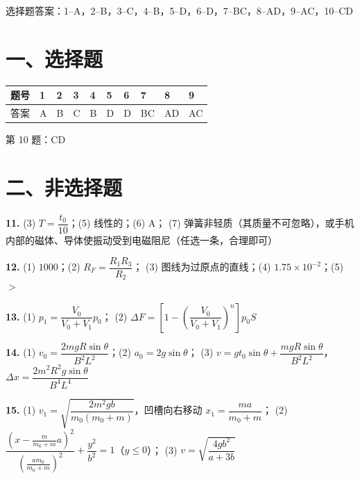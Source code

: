 
\begin{gknotice}
  选择题答案：1--A，2--B，3--C，4--B，5--D，6--D，7--BC，8--AD，9--AC，10--CD
\end{gknotice}

\section*{一、选择题}

\noindent
\begin{tabular}{@{}llllllllll@{}}
\toprule
题号 & 1 & 2 & 3 & 4 & 5 & 6 & 7 & 8 & 9\\
\midrule
答案 & A & B & C & B & D & D & BC & AD & AC\\
\bottomrule
\end{tabular}

\smallskip

\noindent
第 10 题：CD

\section*{二、非选择题}

\noindent
\textbf{11.} (3) $T=\dfrac{t_{0}}{10}$；\quad(5) 线性的；\quad(6) A；\quad
(7) 弹簧非轻质（其质量不可忽略），或手机内部的磁体、导体使振动受到电磁阻尼（任选一条，合理即可）

\smallskip

\noindent
\textbf{12.} (1) $1000$；\quad(2) $R_{F}=\dfrac{R_{1}R_{3}}{R_{2}}$；\quad
(3) 图线为过原点的直线；\quad(4) $1.75\times10^{-2}$；\quad(5) $>$

\smallskip

\noindent
\textbf{13.} (1) $p_{1}=\dfrac{V_{0}}{V_{0}+V_{1}}p_{0}$；\quad
(2) $\Delta F=\left[1-\left(\dfrac{V_{0}}{V_{0}+V_{1}}\right)^{n}\right]p_{0}S$

\smallskip

\noindent
\textbf{14.} (1) $v_{0}=\dfrac{2mgR\sin\theta}{B^{2}L^{2}}$；\quad(2) $a_{0}=2g\sin\theta$；\quad
(3) $v=gt_{0}\sin\theta+\dfrac{mgR\sin\theta}{B^{2}L^{2}}$，\quad
$\Delta x=\dfrac{2m^{2}R^{2}g\sin\theta}{B^{4}L^{4}}$

\smallskip

\noindent
\textbf{15.} (1) $v_{1}=\sqrt{\dfrac{2m^{2}gb}{m_{0}(m_{0}+m)}}$，凹槽向右移动 $x_{1}=\dfrac{ma}{m_{0}+m}$；\quad
(2) $\dfrac{\left(x-\frac{m}{m_{0}+m}a\right)^{2}}{\left(\frac{am_{0}}{m_{0}+m}\right)^{2}}+\dfrac{y^{2}}{b^{2}}=1$（$y\le0$）；\quad
(3) $v=\sqrt{\dfrac{4gb^{2}}{a+3b}}$
